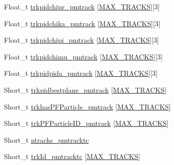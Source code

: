 \begin{DoxyCompactItemize}
\item 
Float\-\_\-t \hyperlink{classanatree_a10afd72e171cb2acdf32f559430cce71}{trkpidchipr\-\_\-pmtrack} \mbox{[}\hyperlink{anatree__core__v09410002_8h_a327fd4e796e4a0d78947524c96e4362e}{M\-A\-X\-\_\-\-T\-R\-A\-C\-K\-S}\mbox{]}\mbox{[}3\mbox{]}
\item 
Float\-\_\-t \hyperlink{classanatree_a7dd6069054219c524b779192e4bfe467}{trkpidchika\-\_\-pmtrack} \mbox{[}\hyperlink{anatree__core__v09410002_8h_a327fd4e796e4a0d78947524c96e4362e}{M\-A\-X\-\_\-\-T\-R\-A\-C\-K\-S}\mbox{]}\mbox{[}3\mbox{]}
\item 
Float\-\_\-t \hyperlink{classanatree_a4836875292cc6bd88013cbfad956e7cf}{trkpidchipi\-\_\-pmtrack} \mbox{[}\hyperlink{anatree__core__v09410002_8h_a327fd4e796e4a0d78947524c96e4362e}{M\-A\-X\-\_\-\-T\-R\-A\-C\-K\-S}\mbox{]}\mbox{[}3\mbox{]}
\item 
Float\-\_\-t \hyperlink{classanatree_a1877c5a4dfb4328d9be64fdca42c0839}{trkpidchimu\-\_\-pmtrack} \mbox{[}\hyperlink{anatree__core__v09410002_8h_a327fd4e796e4a0d78947524c96e4362e}{M\-A\-X\-\_\-\-T\-R\-A\-C\-K\-S}\mbox{]}\mbox{[}3\mbox{]}
\item 
Float\-\_\-t \hyperlink{classanatree_a15e4e0281b72834a80bee0bd4b62b6bf}{trkpidpida\-\_\-pmtrack} \mbox{[}\hyperlink{anatree__core__v09410002_8h_a327fd4e796e4a0d78947524c96e4362e}{M\-A\-X\-\_\-\-T\-R\-A\-C\-K\-S}\mbox{]}\mbox{[}3\mbox{]}
\item 
Short\-\_\-t \hyperlink{classanatree_a827791670ea65487df9280db799a0714}{trkpidbestplane\-\_\-pmtrack} \mbox{[}\hyperlink{anatree__core__v09410002_8h_a327fd4e796e4a0d78947524c96e4362e}{M\-A\-X\-\_\-\-T\-R\-A\-C\-K\-S}\mbox{]}
\item 
Short\-\_\-t \hyperlink{classanatree_a17dccc2e1e357a4d48a853c3c60ec308}{trkhas\-P\-F\-Particle\-\_\-pmtrack} \mbox{[}\hyperlink{anatree__core__v09410002_8h_a327fd4e796e4a0d78947524c96e4362e}{M\-A\-X\-\_\-\-T\-R\-A\-C\-K\-S}\mbox{]}
\item 
Short\-\_\-t \hyperlink{classanatree_a61630bb94d8e1768ff39596d01148676}{trk\-P\-F\-Particle\-I\-D\-\_\-pmtrack} \mbox{[}\hyperlink{anatree__core__v09410002_8h_a327fd4e796e4a0d78947524c96e4362e}{M\-A\-X\-\_\-\-T\-R\-A\-C\-K\-S}\mbox{]}
\item 
Short\-\_\-t \hyperlink{classanatree_afd766c2df1e61b45c609cf32c5f937d1}{ntracks\-\_\-pmtracktc}
\item 
Short\-\_\-t \hyperlink{classanatree_a6d982a56ff1941dd94ae04696f063fda}{trk\-Id\-\_\-pmtracktc} \mbox{[}\hyperlink{anatree__core__v09410002_8h_a327fd4e796e4a0d78947524c96e4362e}{M\-A\-X\-\_\-\-T\-R\-A\-C\-K\-S}\mbox{]}

\end{DoxyCompactItemize}

